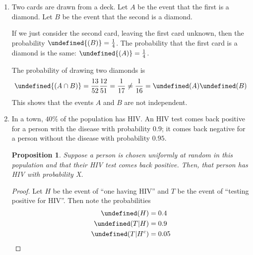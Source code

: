 \documentclass[letterpaper,11pt]{article}
\newtheorem{proposition}{Proposition}
\let\P\undefined
\DeclareMathOperator{\P}{\mathbb{P}}
\newcommand{\intersn}{\cap}
\begin{document}
\begin{enumerate}
\begin{proof}
            \begin{equation*}
                \P(\text{Red}) = \prod_{i=0}^9 \frac{26 - i}{52 - i}
                = \frac{4}{21}
            \end{equation*}

            By symmetry, we have the same probability for drawing ten black
            cards. Finally, we compute the probability of drawing cards of
            different colors.

            \begin{equation*}
                \P{(\text{Red or Black})} = 1 - \frac{8}{21} = \frac{13}{21}
            \end{equation*}
        \end{proof}

    \item
        Two cards are drawn from a deck. Let $A$ be the event that the first is
        a diamond. Let $B$ be the event that the second is a diamond.

        If we just consider the second card, leaving the first card unknown,
        then the probability $\P{(B)} = \frac{1}{4}$. The probability that the
        first card is a diamond is the same: $\P{(A)} = \frac{1}{4}$.

        The probability of drawing two diamonds is
        \begin{equation*}
            \P{(A \intersn B)} = \frac{13}{52} \frac{12}{51} = \frac{1}{17}
            \neq
            \frac{1}{16} = \P(A) \P(B)
        \end{equation*}
        This shows that the events $A$ and $B$ are not independent.

    \item
        In a town, $40\%$ of the population has HIV. An HIV test comes back
        positive for a person with the disease with probability $0.9$; it comes
        back negative for a person without the disease with probability $0.95$.

        \begin{proposition}
            Suppose a person is chosen uniformly at random in this population
            and that their HIV test comes back positive. Then, that person has
            HIV with probability X.
        \end{proposition}

        \begin{proof}
            Let $H$ be the event of ``one having HIV'' and
            $T$ be the event of ``testing positive for HIV''.
            Then note the probabilities
            \begin{align*}
                \P(H) &= 0.4 \\
                \P(T|H) &= 0.9 \\
                \P(T|H^c) &= 0.05
            \end{align*}


\end{proof}
\end{enumerate}
\end{document}

